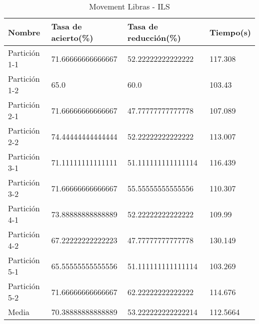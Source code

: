 \begin{table}[H]
	\centering
	\begin{tabular}{l|lll}
		Nombre        & Tasa de acierto(\%) & Tasa de reducción(\%) & Tiempo(s) \\ \hline
		Partición 1-1 & 71.66666666666667   & 52.22222222222222     & 117.308   \\
		Partición 1-2 & 65.0                & 60.0                  & 103.43    \\
		Partición 2-1 & 71.66666666666667   & 47.77777777777778     & 107.089   \\
		Partición 2-2 & 74.44444444444444   & 52.22222222222222     & 113.007   \\
		Partición 3-1 & 71.11111111111111   & 51.111111111111114    & 116.439   \\
		Partición 3-2 & 71.66666666666667   & 55.55555555555556     & 110.307   \\
		Partición 4-1 & 73.88888888888889   & 52.22222222222222     & 109.99    \\
		Partición 4-2 & 67.22222222222223   & 47.77777777777778     & 130.149   \\
		Partición 5-1 & 65.55555555555556   & 51.111111111111114    & 103.269   \\
		Partición 5-2 & 71.66666666666667   & 62.22222222222222     & 114.676   \\ \hline
		Media         & 70.38888888888889   & 53.222222222222214    & 112.5664
	\end{tabular}
	\caption{Movement Libras - ILS}
	\label{MLIB-ILS}
\end{table}